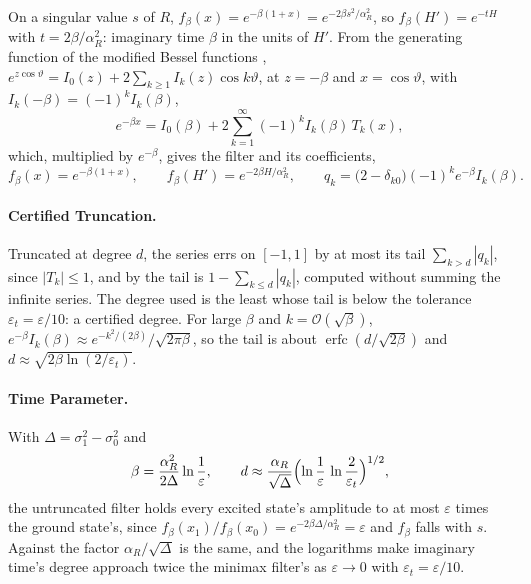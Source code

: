 On a singular value $s$ of $R$, $f_\beta(x)=e^{-\beta(1+x)}=e^{-2\beta s^2/\alpha_R^2}$, so $f_\beta(H')=e^{-tH}$ with $t=2\beta/\alpha_R^2$: imaginary time $\beta$ in the units of $H'$. From the generating function of the modified Bessel functions \cite{abramowitz1964handbook}, $e^{z\cos\vartheta}=I_0(z)+2\sum_{k\ge1}I_k(z)\cos k\vartheta$, at $z=-\beta$ and $x=\cos\vartheta$, with $I_k(-\beta)=(-1)^kI_k(\beta)$,
\begin{equation}
    e^{-\beta x}=I_0(\beta)+2\sum_{k=1}^{\infty}(-1)^kI_k(\beta)\,T_k(x),
    \label{eq:bessel-expansion}
\end{equation}
which, multiplied by $e^{-\beta}$, gives the filter and its coefficients,
\begin{equation}
    f_\beta(x)=e^{-\beta(1+x)},
    \qquad
    f_\beta(H')=e^{-2\beta H/\alpha_R^2},
    \qquad
    q_k=\bigl(2-\delta_{k0}\bigr)(-1)^k e^{-\beta} I_k(\beta).
    \label{eq:qite-filter}
\end{equation}

\paragraph{Certified Truncation.} Truncated at degree $d$, the series errs on $[-1,1]$ by at most its tail $\sum_{k>d}|q_k|$, since $|T_k|\le1$, and by  the tail is $1-\sum_{k\le d}|q_k|$, computed without summing the infinite series. The degree used is the least whose tail is below the tolerance $\varepsilon_t=\varepsilon/10$: a certified degree. For large $\beta$ and $k=\mathcal{O}(\sqrt\beta)$, $e^{-\beta}I_k(\beta)\approx e^{-k^2/(2\beta)}/\sqrt{2\pi\beta}$, so the tail is about $\operatorname{erfc}(d/\sqrt{2\beta})$ and $d\approx\sqrt{2\beta\ln(2/\varepsilon_t)}$.

\paragraph{Time Parameter.} With $\Delta=\sigma_1^2-\sigma_0^2$ and
\begin{equation}
    \beta=\frac{\alpha_R^2}{2\Delta}\ln\frac1\varepsilon,
    \qquad
    d\approx\frac{\alpha_R}{\sqrt\Delta}\Bigl(\ln\frac1\varepsilon\,\ln\frac2{\varepsilon_t}\Bigr)^{1/2},
    \label{eq:qite-parameters}
\end{equation}
the untruncated filter holds every excited state's amplitude to at most $\varepsilon$ times the ground state's, since $f_\beta(x_1)/f_\beta(x_0)=e^{-2\beta\Delta/\alpha_R^2}=\varepsilon$ and $f_\beta$ falls with $s$. Against  the factor $\alpha_R/\sqrt\Delta$ is the same, and the logarithms make imaginary time's degree approach twice the minimax filter's as $\varepsilon\to0$ with $\varepsilon_t=\varepsilon/10$.

